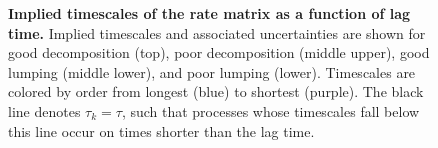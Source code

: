 \begin{figure}[tbp]
  \begin{center}
  \end{center}
  \caption{
  {\bf Implied timescales of the rate matrix as a function of lag time.}  
  Implied timescales and associated uncertainties are shown for good decomposition (top), poor decomposition (middle upper), good lumping (middle lower), and poor lumping (lower).
  Timescales are colored by order from longest (blue) to shortest (purple).
  The black line denotes $\tau_k = \tau$, such that processes whose timescales fall below this line occur on times shorter than the lag time.
  }
  \label{validation:figure:timescales}
\end{figure}

